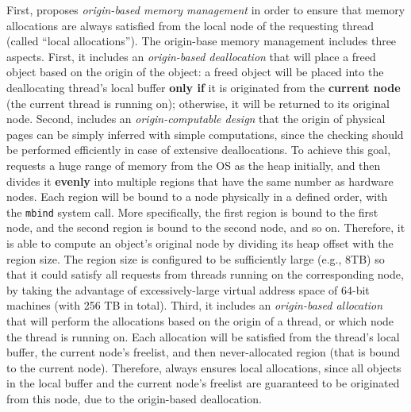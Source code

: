 First, \NM{} proposes \textit{origin-based memory management} in order to ensure that memory allocations are always satisfied from the local node of the requesting thread (called ``local allocations''). The origin-base memory management includes three aspects. First, it includes an \textit{origin-based deallocation} that will place a freed object based on the origin of the object: a freed object will be placed into the deallocating thread's local buffer \textbf{only if} it is originated from the \textbf{current node} (the current thread is running on); otherwise, it will be returned to its original node. Second, \NM{} includes an \textit{origin-computable design} that the origin of physical pages can be simply inferred with simple computations, since the checking should be performed efficiently in case of extensive deallocations. To achieve this goal, \NM{} requests a huge range of memory from the OS as the heap initially, and then divides it \textbf{evenly} into multiple regions that have the same number as hardware nodes. Each region will be bound to a node physically in a defined order, with the \texttt{mbind} system call. More specifically, the first region is bound to the first node, and the second region is bound to the second node, and so on. Therefore, it is able to compute an object's original node by dividing its heap offset with the region size. The region size is configured to be sufficiently large (e.g., 8TB) so that it could satisfy all requests from threads running on the corresponding node, by taking the advantage of excessively-large virtual address space of 64-bit machines (with 256 TB in total).
Third, it includes an \textit{origin-based allocation} that will perform the allocations based on the origin of a thread, or which node the thread is running on.  Each allocation will be satisfied from the thread's local buffer, the current node's freelist, and then never-allocated region (that is bound to the current node). Therefore, \NM{} always ensures local allocations, since all objects in the local buffer and the current node's freelist are guaranteed to be originated from this node, due to the origin-based deallocation. 


